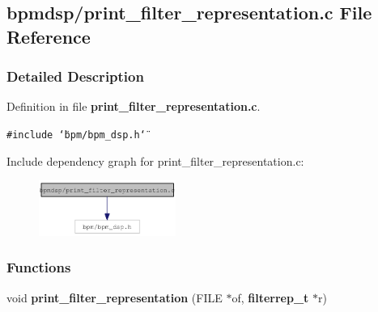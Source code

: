 \subsection{bpmdsp/print\_\-filter\_\-representation.c File Reference}
\label{print__filter__representation_8c}


\subsubsection{Detailed Description}


Definition in file {\bf print\_\-filter\_\-representation.c}.

{\tt \#include \char`\"{}bpm/bpm\_\-dsp.h\char`\"{}}\par


Include dependency graph for print\_\-filter\_\-representation.c:\nopagebreak
\begin{figure}[H]
\begin{center}
\leavevmode
\includegraphics[width=127pt]{print__filter__representation_8c__incl}
\end{center}
\end{figure}
\subsubsection*{Functions}
\begin{CompactItemize}
\item 
void {\bf print\_\-filter\_\-representation} (FILE $\ast$of, {\bf filterrep\_\-t} $\ast$r)
\end{CompactItemize}
